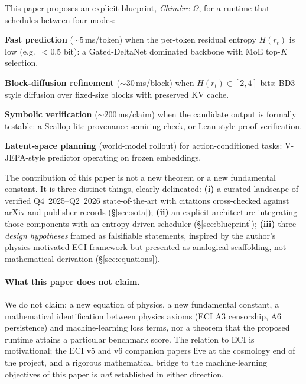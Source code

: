 \documentclass[10pt,a4paper]{article}
\theoremstyle{remark}
\begin{document}
This paper proposes an explicit blueprint, \emph{Chim\`ere $\Omega$},
for a runtime that schedules between four modes:
\begin{description}[leftmargin=*,itemsep=3pt]
 \item[M1.] \textbf{Fast prediction} ($\sim 5$\,ms/token) when the
   per-token residual entropy $H(r_t)$ is low (e.g.\ $<0.5$ bit): a
   Gated-DeltaNet dominated backbone with MoE top-$K$ selection.
 \item[M2.] \textbf{Block-diffusion refinement}
   ($\sim 30$\,ms/block) when $H(r_t) \in [2,4]$ bits: BD3-style
   diffusion over fixed-size blocks with preserved KV cache.
 \item[M3.] \textbf{Symbolic verification} ($\sim 200$\,ms/claim) when
   the candidate output is formally testable: a Scallop-lite
   provenance-semiring check, or Lean-style proof verification.
 \item[M4.] \textbf{Latent-space planning} (world-model rollout) for
   action-conditioned tasks: V-JEPA-style predictor operating on
   frozen embeddings.
\end{description}

The contribution of this paper is not a new theorem or a new
fundamental constant. It is three distinct things, clearly
delineated: \textbf{(i)} a curated landscape of verified Q4~2025--Q2~2026
state-of-the-art with citations cross-checked against arXiv and
publisher records (\S\ref{sec:sota}); \textbf{(ii)} an explicit
architecture integrating those components with an entropy-driven
scheduler (\S\ref{sec:blueprint}); \textbf{(iii)} three \emph{design
hypotheses} framed as falsifiable statements, inspired by the
author's physics-motivated ECI framework but presented as analogical
scaffolding, not mathematical derivation (\S\ref{sec:equations}).

\paragraph{What this paper does not claim.}
We do not claim: a new equation of physics, a new fundamental
constant, a mathematical identification between physics axioms (ECI
A3 censorship, A6 persistence) and machine-learning
loss terms, nor a theorem that the proposed runtime attains a
particular benchmark score. The relation to ECI is motivational;
the ECI v5 and v6 companion papers live at the cosmology end of the
project, and a rigorous mathematical bridge to the machine-learning
objectives of this paper is \emph{not} established in either
direction.
\end{document}
